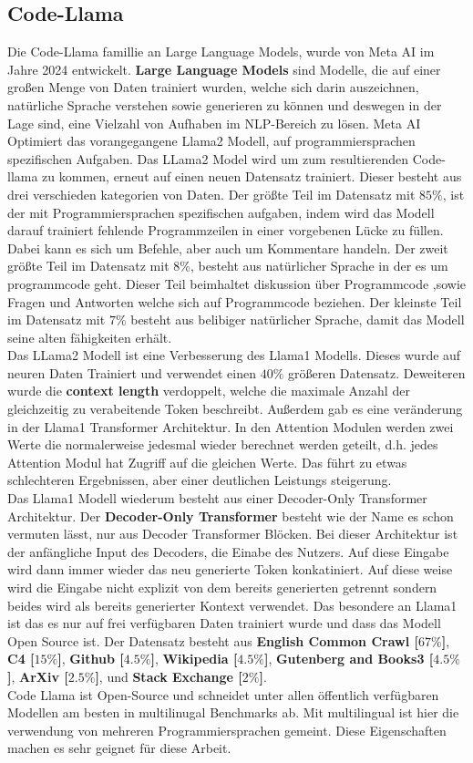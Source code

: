 \documentclass[12pt,letterpaper,ngerman]{article}
\begin{document}
\subsection{Code-Llama}
Die Code-Llama famillie an Large Language Models, wurde von Meta AI im Jahre
2024 entwickelt. {\bf Large Language Models} sind Modelle, die auf einer
großen Menge von Daten trainiert wurden, welche sich darin auszeichnen,
natürliche Sprache verstehen sowie generieren zu können und deswegen in 
der Lage sind, eine Vielzahl von Aufhaben im NLP-Bereich zu lösen.
Meta AI Optimiert das vorangegangene Llama2 Modell, auf programmiersprachen 
spezifischen Aufgaben. Das LLama2 Model wird um zum resultierenden Code-llama
zu kommen, erneut auf einen neuen Datensatz trainiert. Dieser besteht aus
drei verschieden kategorien von Daten. Der größte Teil im Datensatz mit
$85\%$, ist der mit
Programmiersprachen spezifischen aufgaben, indem wird das Modell darauf 
trainiert fehlende Programmzeilen in einer vorgebenen Lücke zu füllen.
Dabei kann es sich um Befehle, aber auch um Kommentare handeln. Der zweit 
größte Teil im Datensatz mit $8\%$, besteht aus natürlicher Sprache in der 
es um programmcode geht. Dieser Teil beimhaltet diskussion über Programmcode
,sowie Fragen und Antworten welche sich auf Programmcode beziehen. Der kleinste
Teil im Datensatz mit $7\%$ besteht aus belibiger natürlicher Sprache, damit
das Modell seine alten fähigkeiten erhält. \\
Das LLama2 Modell ist eine Verbesserung des Llama1 Modells. Dieses wurde auf
neuren Daten Trainiert und verwendet einen $40\%$ größeren Datensatz.
Deweiteren wurde die {\bf context length} verdoppelt, welche die maximale
Anzahl der gleichzeitig zu verabeitende Token beschreibt. Außerdem gab es
eine veränderung in der Llama1 Transformer Architektur. In den Attention 
Modulen werden zwei Werte die normalerweise jedesmal wieder berechnet
werden geteilt, d.h. jedes Attention Modul hat Zugriff auf die gleichen
Werte. Das führt zu etwas schlechteren Ergebnissen, aber einer deutlichen
Leistungs steigerung.\\
Das Llama1 Modell wiederum besteht aus einer Decoder-Only Transformer
Architektur. Der {\bf Decoder-Only Transformer} besteht wie der Name es schon
vermuten lässt, nur aus Decoder Transformer Blöcken. Bei dieser Architektur
ist der anfängliche Input des Decoders, die Einabe des Nutzers. Auf diese
Eingabe wird dann immer wieder das neu generierte Token konkatiniert. Auf diese
weise wird die Eingabe nicht explizit von dem bereits generierten getrennt
sondern beides wird als bereits generierter Kontext verwendet. Das besondere
an Llama1 ist das es nur auf frei verfügbaren Daten trainiert wurde und 
dass das Modell Open Source ist. Der Datensatz besteht aus {\bf English 
Common Crawl [$67\%$]}, {\bf C4 [$15\%$]}, {\bf Github [$4.5\%$]},
{\bf Wikipedia [$4.5\%$]}, {\bf Gutenberg and Books3 [$4.5\%$]}, 
{\bf ArXiv [$2.5\%$]}, und {\bf Stack Exchange [$2\%$]}.\\
Code Llama ist Open-Source und schneidet unter allen öffentlich verfügbaren
Modellen am besten in multilinugal Benchmarks ab. Mit multilingual ist hier die
verwendung von mehreren Programmiersprachen gemeint. Diese 
Eigenschaften machen es sehr geignet für diese Arbeit.
\end{document}
